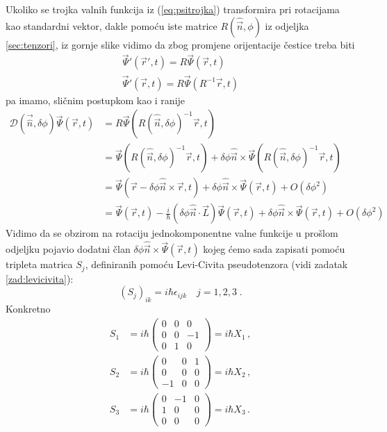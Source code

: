 Ukoliko se trojka valnih funkcija iz (\ref{eq:psitrojka}) transformira
pri rotacijama kao standardni vektor, dakle pomoću iste matrice $R(\hat{\vec{n}}, \phi)$
iz odjeljka \ref{sec:tenzori}, iz gornje slike vidimo da zbog promjene
orijentacije čestice treba biti
\begin{gather*}
\vec{\Psi}'(\vec{r}',t)=R \vec{\Psi}(\vec{r},t) \\
\vec{\Psi}'(\vec{r},t)=R \vec{\Psi}(R^{-1}\vec{r},t) 
\end{gather*}
pa imamo, sličnim postupkom kao i ranije
\begin{equation*}
\begin{split}
\mathcal{D}(\vec{\hat{n}},\delta\phi)\vec{\Psi}(\vec{r}, t)&=
 R \vec{\Psi}(R(\hat{\vec{n}},\delta \phi)^{-1}
\vec{r}, t) \\
 &=\vec{\Psi}(R(\hat{\vec{n}}, \delta\phi)^{-1}\vec{r}, t)+
\delta\phi \hat{\vec{n}}\times\vec{\Psi}(
R(\hat{\vec{n}}, \delta\phi)^{-1}\vec{r},t) \\
 &=\vec{\Psi}(\vec{r}-\delta\phi\hat{\vec{n}}\times\vec{r}, t)+
\delta\phi \hat{\vec{n}}\times\vec{\Psi}(\vec{r},t) + O(\delta\phi^2) \\
 &= \vec{\Psi}(\vec{r}, t)-\frac{i}{\hbar}(\delta\phi\hat{\vec{n}}\cdot
  \vec{L})\vec{\Psi}(\vec{r}, t)+
\delta\phi \hat{\vec{n}}\times\vec{\Psi}(\vec{r},t) + O(\delta\phi^2)
\end{split}
\end{equation*}
Vidimo da se obzirom na rotaciju jednokomponentne valne funkcije u prošlom
odjeljku pojavio dodatni član $\delta\phi \hat{\vec{n}}\times\vec{\Psi}(\vec{r},t)$
kojeg ćemo sada zapisati pomoću tripleta matrica $S_{j}$,
definiranih pomoću Levi-Civita pseudotenzora (vidi zadatak \ref{zad:levicivita}):
\begin{equation}
(S_j)_{ik} = i\hbar\epsilon_{ijk} \quad j=1,2,3 \;.
\end{equation}
Konkretno
\begin{align}
S_1& =i\hbar
\begin{pmatrix}
0 & 0 & 0 \\
0 & 0 &-1 \\
0 & 1 & 0
\end{pmatrix} = i\hbar X_1 \,,\\
S_2& = i\hbar
\begin{pmatrix}
0 & 0 & 1 \\
0 & 0 & 0 \\
-1 & 0 & 0
\end{pmatrix} = i\hbar X_2 \,, \\
S_3& = i\hbar
\begin{pmatrix}
0 & -1 & 0 \\
1 & 0 & 0\\
0 & 0 & 0
\end{pmatrix} = i\hbar X_3 \,.
\end{align}
